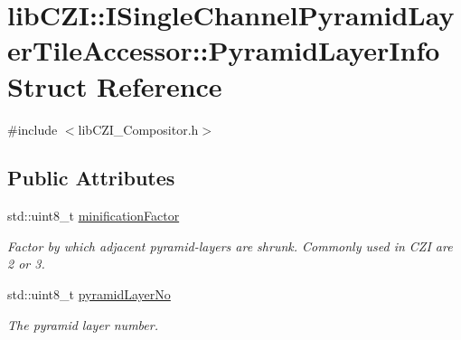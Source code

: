 \hypertarget{structlib_c_z_i_1_1_i_single_channel_pyramid_layer_tile_accessor_1_1_pyramid_layer_info}{}\section{lib\+C\+ZI\+:\+:I\+Single\+Channel\+Pyramid\+Layer\+Tile\+Accessor\+:\+:Pyramid\+Layer\+Info Struct Reference}
\label{structlib_c_z_i_1_1_i_single_channel_pyramid_layer_tile_accessor_1_1_pyramid_layer_info}


{\ttfamily \#include $<$lib\+C\+Z\+I\+\_\+\+Compositor.\+h$>$}

\subsection*{Public Attributes}
\begin{DoxyCompactItemize}
\item 
\mbox{\label{structlib_c_z_i_1_1_i_single_channel_pyramid_layer_tile_accessor_1_1_pyramid_layer_info_a533419024a6645305568efbd42100b45}} 
std\+::uint8\+\_\+t \hyperlink{structlib_c_z_i_1_1_i_single_channel_pyramid_layer_tile_accessor_1_1_pyramid_layer_info_a533419024a6645305568efbd42100b45}{minification\+Factor}
\begin{DoxyCompactList}\small\item\em Factor by which adjacent pyramid-\/layers are shrunk. Commonly used in C\+ZI are 2 or 3. \end{DoxyCompactList}\item 
\mbox{\label{structlib_c_z_i_1_1_i_single_channel_pyramid_layer_tile_accessor_1_1_pyramid_layer_info_a8e10d960baf73d757ef512294a360957}} 
std\+::uint8\+\_\+t \hyperlink{structlib_c_z_i_1_1_i_single_channel_pyramid_layer_tile_accessor_1_1_pyramid_layer_info_a8e10d960baf73d757ef512294a360957}{pyramid\+Layer\+No}
\begin{DoxyCompactList}\small\item\em The pyramid layer number. \end{DoxyCompactList}\end{DoxyCompactItemize}


